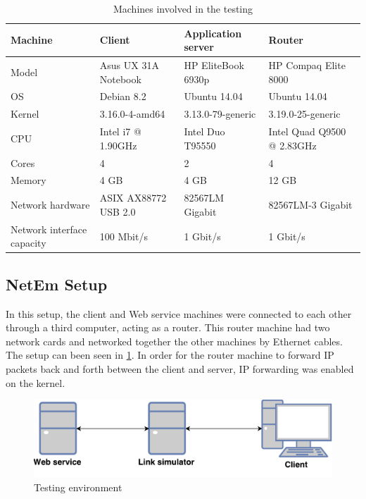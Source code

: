 \begin{table}[h]
\begin{tabular}{| l | l | l | l |}
\hline
  \textbf{Machine} & \textbf{Client} & \textbf{Application server} & \textbf{Router}\\ \hline
  Model & Asus UX 31A Notebook & HP EliteBook 6930p & HP Compaq Elite 8000 \\ \hline
  OS & Debian 8.2 & Ubuntu 14.04 & Ubuntu 14.04\\ \hline
  Kernel & 3.16.0-4-amd64 & 3.13.0-79-generic & 3.19.0-25-generic\\ \hline
  CPU & Intel i7 @ 1.90GHz & Intel Duo T95550 & Intel Quad Q9500 @ 2.83GHz \\ \hline
  Cores & 4 & 2 & 4\\ \hline
  Memory & 4 GB & 4 GB & 12 GB\\ \hline
  Network hardware & ASIX AX88772 USB 2.0 & 82567LM Gigabit & 82567LM-3 Gigabit\\ \hline
  Network interface capacity & 100 Mbit/s & 1 Gbit/s & 1 Gbit/s \\ \hline
\end{tabular}
\caption{Machines involved in the testing}
\label{table-machines}
\end{table}

\subsection{NetEm Setup}

In this setup, the client and Web service machines were connected to each other
through a third computer, acting as a router. This router machine had two
network cards and networked together the other machines by Ethernet cables. The
setup can been seen in \cref{figure-testing-environment}. In order for the
router machine to forward IP packets back and forth between the client and
server, IP forwarding was enabled on the kernel.

\begin{figure}[h]
\includegraphics[scale=0.6]{images/testing_environment.pdf}
\caption{Testing environment}
\label{figure-testing-environment}
\end{figure}


